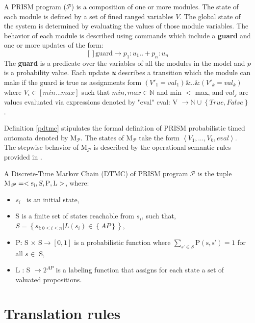 \documentclass[3p,times,procedia,authoryear,round]{elsarticle}
\begin{document}
A PRISM program ($\mathscr{P}$) is a composition of one or more modules. The state of each module is defined by a set of fined ranged variables $V$. The global state of the system is determined by evaluating the values of those module variables. The behavior of each module is described using commands which include a \textbf{guard} and one or more updates of the form: $$[ ]\mathrm{guard} \rightarrow p_{1} :u_{1}..+ p_{n}:u_{n}$$  The \textbf{guard} is a predicate over the variables of all the modules in the model and \textbf{\emph{$p$}}  is a probability value. Each  update \textbf{\emph{u}} describes a transition which the module can make if the guard is true as assignments form $(V'_{1}=val_{1})$\&..\&$(V'_{k}=val_{k}) $ where $ V_{i} \in \left[min. . .max\right] $  such that $min, max \in \mathbb{N}$ and min $<$ max,  and $val_{j} $ are values evaluated via expressions denoted by "eval" eval: V $ \rightarrow \mathbb{N} \cup \left\{True, False\right\}$.

Definition \ref{pdtmc} stipulates the formal definition of PRISM probabilistic timed automata denoted by $\mathrm{M}_{\mathscr{P}}$. The states of $\mathrm{M}_{\mathscr{P}}$ take the form $\left\langle V_{1}, . . . , V_{k}, eval\right\rangle$. The stepwise behavior of $\mathrm{M}_{\mathscr{P}}$ is described by the operational semantic rules provided in \citep{Baouya20157493}.

\begin{mydef} \label{pdtmc} A Discrete-Time Markov Chain (DTMC) of PRISM program $\mathscr{P}$ is the tuple $\mathrm{M_{\mathscr{P}}=< s_{i} , \textsl{S}, P , L >}$, where:

\begin{itemize}
	\item $s_{i} $ \ is an initial state,
	\item S is a finite set of states reachable from $s_{i} $, such that, $S =\left\{s_{i:0\leq i\leq n}| L(s_{i}) \in \left\{ AP\right\}\right\}$,
    
	\item	P: S $  \times$ S$\rightarrow [0,1] $ is a probabilistic function where $\sum_{s'\in S}\mathrm{P(s,s')}=1$ for all  $s\in$ S,
	
	
	\item L : S $\rightarrow 2^{AP}$ is a labeling function that assigns for each state a set of valuated propositions.
\end{itemize}
 \end{mydef} 
\section{Translation rules}
\label{secverf}
\end{document}
